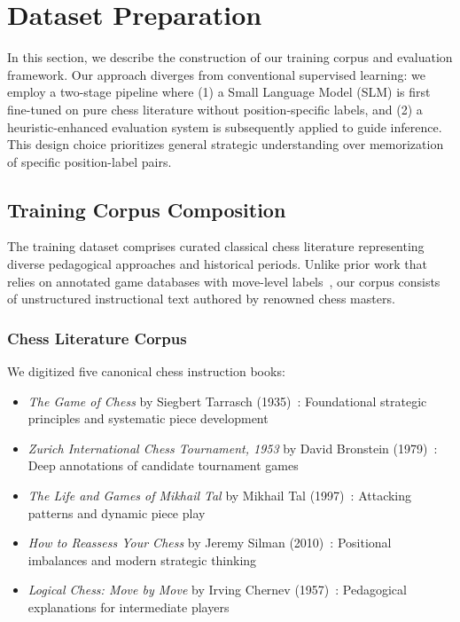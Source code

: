 \documentclass[sigconf,nonacm]{acmart}
\begin{document}
\section{Dataset Preparation}
\label{sec:dataset}
In this section, we describe the construction of our training corpus and evaluation framework. Our approach diverges from conventional supervised learning: we employ a two-stage pipeline where (1) a Small Language Model (SLM) is first fine-tuned on pure chess literature without position-specific labels, and (2) a heuristic-enhanced evaluation system is subsequently applied to guide inference. This design choice prioritizes general strategic understanding over memorization of specific position-label pairs.


\subsection{Training Corpus Composition}
\label{subsec:corpus-comp}

The training dataset comprises curated classical chess literature representing diverse pedagogical approaches and historical periods. Unlike prior work that relies on annotated game databases with move-level labels~\cite{jhamtani2018chess}, our corpus consists of unstructured instructional text authored by renowned chess masters.

\subsubsection{Chess Literature Corpus}

We digitized five canonical chess instruction books:

\begin{itemize}
    \item \textit{The Game of Chess} by Siegbert Tarrasch (1935)~\cite{tarrasch1935game}: Foundational strategic principles and systematic piece development
    \item \textit{Zurich International Chess Tournament, 1953} by David Bronstein (1979)~\cite{bronstein1979zurich}: Deep annotations of candidate tournament games
    \item \textit{The Life and Games of Mikhail Tal} by Mikhail Tal (1997)~\cite{tal1997life}: Attacking patterns and dynamic piece play
    \item \textit{How to Reassess Your Chess} by Jeremy Silman (2010)~\cite{silman2010reassess}: Positional imbalances and modern strategic thinking
    \item \textit{Logical Chess: Move by Move} by Irving Chernev (1957)~\cite{chernev1957logical}: Pedagogical explanations for intermediate players
\end{itemize}
\end{document}
